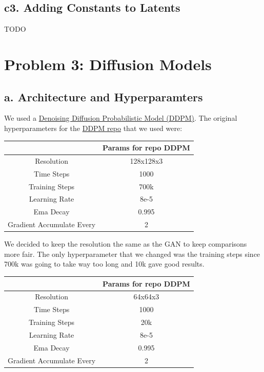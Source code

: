 \documentclass{article}
\begin{document}
\begin{center}
\end{center}

\subsection*{c3. Adding Constants to Latents}
TODO

\newpage
\section*{Problem 3: Diffusion Models}
\subsection*{a. Architecture and Hyperparamters}
We used a \href{https://arxiv.org/pdf/2006.11239.pdf}{Denoising Diffusion Probabilistic Model (DDPM)}. The original hyperparameters for
the \href{https://github.com/lucidrains/denoising-diffusion-pytorch}{DDPM repo} that we used were:
\begin{center}
\begin{tabular}{|c|c|}
\hline
& Params for repo DDPM \\ \hline
Resolution & 128x128x3 \\ \hline
Time Steps & 1000 \\ \hline
Training Steps & 700k \\ \hline
Learning Rate & 8e-5 \\ \hline
Ema Decay & 0.995 \\ \hline
Gradient Accumulate Every & 2 \\ \hline
\end{tabular}
\end{center}

\noindent We decided to keep the resolution the same as the GAN to
keep comparisons more fair. The only hyperparameter that we changed was
the training steps since 700k was going to take way too long
and 10k gave good results.

\begin{center}
\begin{tabular}{|c|c|}
\hline
& Params for repo DDPM \\ \hline
Resolution & 64x64x3 \\ \hline
Time Steps & 1000 \\ \hline
Training Steps & 20k \\ \hline
Learning Rate & 8e-5 \\ \hline
Ema Decay & 0.995 \\ \hline
Gradient Accumulate Every & 2 \\ \hline
\end{tabular}
\end{center}
\end{document}
